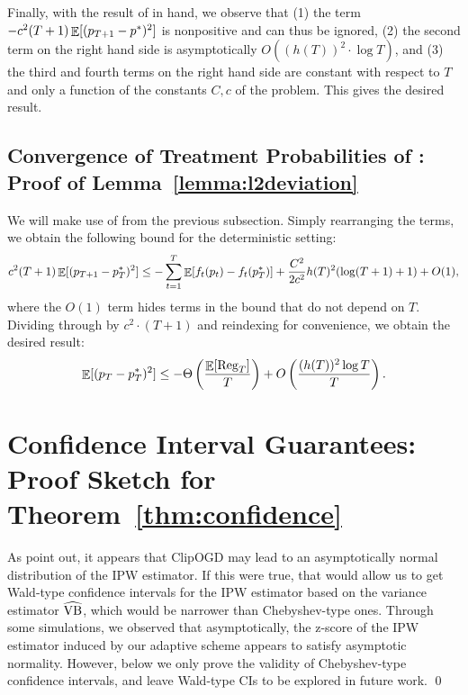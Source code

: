 Finally, with the result of  in hand, we observe that (1) the term $- c^2 (T+1) \mathop{\mathbb{E}}[(p_{T+1} - p^*)^2]$ is nonpositive and can thus be ignored, (2) the second term on the right hand side is asymptotically $O((h(T))^2 \cdot \log T)$, and (3) the third and fourth terms on the right hand side are constant with respect to $T$ and only a function of the constants $C, c$ of the problem. This gives the desired result.

\subsection{Convergence of Treatment Probabilities of \ClipOGDSC: Proof of Lemma~\ref{lemma:l2deviation}}

We will make use of  from the previous subsection. Simply rearranging the terms, we obtain the following bound for the deterministic setting:
    \[
    c^2 (T+1) \mathop{\mathbb{E}}[(p_{T+1} - p^*_T)^2] \leq - \sum_{t=1}^T \mathop{\mathbb{E}}[f_t(p_t) - f_t(p^*_T)] + \frac{C^2}{2c^2} h(T)^2(\log (T+1) + 1)  + O(1),
    \]
    where the $O(1)$ term hides terms in the bound that do not depend on $T$. Dividing through by $c^2 \cdot (T+1)$ and reindexing for convenience, we obtain the desired result:
    \[
        \mathop{\mathbb{E}}[(p_{T} - p^*_T)^2] \leq -\Theta\left(\frac{\mathop{\mathbb{E}}[\mathrm{Reg}_T]}{T}\right) + O\left(\frac{(h(T))^2 \log T}{T}\right). \qedhere
    \]


\section{Confidence Interval Guarantees: Proof Sketch for Theorem~\ref{thm:confidence}} \label{app:confidence}

\begin{remark}
As \citet{dai2023clip} point out, it appears that ClipOGD may lead to an asymptotically normal distribution of the IPW estimator. If this were true, that would allow us to get Wald-type confidence intervals for the IPW estimator based on the variance estimator $\widehat{\mathrm{VB}}$, which would be narrower than Chebyshev-type ones. Through some simulations, we observed that asymptotically, the z-score of the IPW estimator induced by our adaptive scheme appears to satisfy asymptotic normality. However, below we only prove the validity of Chebyshev-type confidence intervals, and leave Wald-type CIs to be explored in future work. \qed
\end{remark}

